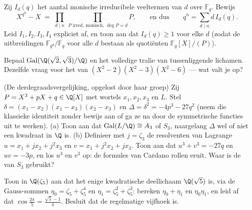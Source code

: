 \begin{exercise}[$\star\star$]\label{exo:b3:galois:6}
Zij $I_d(q)$ het aantal monische irreducibele veeltermen van 
$d$ over $\mathbb F_q$. Bewijs
\[
X^{q^n} - X \;=\; \prod_{d \mid n}\ \prod_{P \text{ irred.
monisch, } \deg P = d} P ,
\qquad\text{en dus}\qquad
q^n = \sum_{d \mid n} d\, I_d(q).
\]
Leid $I_1, I_2, I_3, I_4$ expliciet af, en toon aan dat $I_d(q)
\geq 1$ voor elke $d$ (zodat de uitbreidingen $\mathbb
F_{q^d}/\mathbb F_q$ voor alle $d$ bestaan als quotiënten $\mathbb
F_q[X]/(P)$).
\end{exercise}

\begin{exercise}[$\star\star$]\label{exo:b3:galois:7}
Bepaal $\operatorname{Gal}(\Q(\sqrt2,\sqrt3)/\Q)$ en het volledige
tralie van tussenliggende lichamen. Dezelfde vraag voor het
 van $(X^2-2)(X^2-3)(X^2-6)$ --- wat valt je op?
\end{exercise}

\begin{exercise}[$\star\star$]\label{exo:b3:galois:8}
(De derdegraadsvergelijking, opgelost door haar groep) Zij $P =
X^3 + pX + q \in \Q[X]$  met wortels $x_1, x_2, x_3$ en
 $L$. Stel $\delta = (x_1 - x_2)(x_1 - x_3)(x_2 -
x_3)$ en $\Delta = \delta^2 = -4p^3 - 27q^2$ (neem die klassieke
identiteit zonder bewijs aan of ga ze na door de symmetrische
functies uit te werken).
(a) Toon aan dat $\operatorname{Gal}(L/\Q) \cong A_3$ of $S_3$,
naargelang $\Delta$ wel of niet een kwadraat in $\Q$ is.
(b) Definieer met $j = \zeta_3$ de resolventen van Lagrange $u =
x_1 + jx_2 + j^2x_3$ en $v = x_1 + j^2x_2 + jx_3$. Toon aan dat
$u^3 + v^3 = -27q$ en $uv = -3p$, en los $u^3$ en $v^3$ op: de
formules van Cardano rollen eruit. Waar is de  van
$S_3$ gebruikt?
\end{exercise}

\begin{exercise}[$\star\star$]\label{exo:b3:galois:9}
Toon in $\Q(\zeta_5)$ aan dat het enige kwadratische deellichaam
$\Q(\sqrt5)$ is, via de Gauss-sommen $\eta_0 = \zeta_5 +
\zeta_5^4$ en $\eta_1 = \zeta_5^2 + \zeta_5^3$: bereken $\eta_0 +
\eta_1$ en $\eta_0\eta_1$, en leid af dat $\cos\frac{2\pi}5 =
\frac{\sqrt5 - 1}4$. Besluit dat de regelmatige vijfhoek
 is.
\end{exercise}

